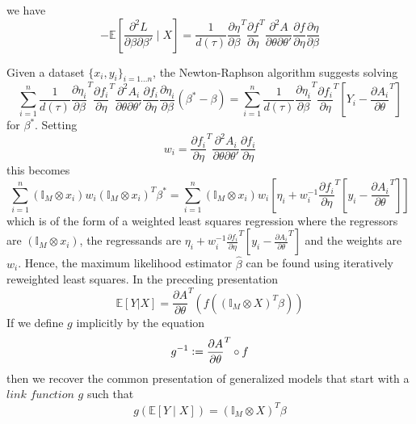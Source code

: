 \documentclass[11pt]{article}
\begin{document}
we have
\begin{equation}
- \mathbb{E} \left[ \frac{\partial^2 L}{\partial \beta \partial \beta'} \mid X \right] =
\frac{1}{d \left( \tau \right)}
\frac{\partial \eta}{\partial \beta}^T \frac{\partial f}{\partial \eta}^T \frac{\partial^2 A}{\partial \theta \partial \theta'} \frac{\partial f}{\partial \eta} \frac{\partial \eta}{\partial \beta}
\end{equation}

Given a dataset $\{ x_i, y_i \}_{i=1...n}$, the Newton-Raphson algorithm suggests solving
\begin{equation}
\sum_{i=1}^n \frac{1}{d \left( \tau \right)}
\frac{\partial \eta_i}{\partial \beta}^T \frac{\partial f_i}{\partial \eta}^T \frac{\partial^2 A_i}{\partial \theta \partial \theta'} \frac{\partial f_i}{\partial \eta} \frac{\partial \eta_i}{\partial \beta} \left( \beta^* - \beta \right) =
\sum_{i=1}^n \frac{1}{d \left( \tau \right)} \frac{\partial \eta_i}{\partial \beta}^T \frac{\partial f_i}{\partial \eta}^T \left[ Y_i - \frac{\partial A_i}{\partial \theta}^T \right] 
\end{equation}
for $\beta^*$.
Setting
\begin{equation}
w_i = \frac{\partial f_i}{\partial \eta}^T \frac{\partial^2 A_i}{\partial \theta \partial \theta'} \frac{\partial f_i}{\partial \eta}
\end{equation}
this becomes
\begin{equation}
\sum_{i=1}^n \left( \mathbb{I}_M \otimes x_i \right) w_i \left( \mathbb{I}_M \otimes x_i \right)^T \beta^* =
\sum_{i=1}^n \left( \mathbb{I}_M \otimes x_i \right) w_i
\left[ \eta_i + w_i^{-1} \frac{\partial f_i}{\partial \eta}^T \left[ y_i - \frac{\partial A_i}{\partial \theta}^T \right] \right]
\end{equation}
which is of the form of a weighted least squares regression where the regressors are $\left( \mathbb{I}_M \otimes x_i \right)$, the regressands are $\eta_i + w_i^{-1} \frac{\partial f_i}{\partial \eta}^T \left[ y_i - \frac{\partial A_i}{\partial \theta}^T \right]$ and the weights are $w_i$. Hence, the maximum likelihood estimator $\widehat{\beta}$ can be found using iteratively reweighted least squares.
In the preceding presentation
\begin{equation}
\mathbb{E} \left[ Y | X \right] = \frac{\partial A}{\partial \theta}^T \left( f \left( \left( \mathbb{I}_M \otimes X \right)^T \beta \right) \right)
\end{equation}
If we define $g$ implicitly by the equation
\begin{equation}
g^{-1} \vcentcolon = \frac{\partial A}{\partial \theta}^T \circ f
\end{equation}
then we recover the common presentation of generalized models that start with a $link$ $function$ $g$ such that
\begin{equation}
g \left( \mathbb{E} \left[ Y \mid X \right] \right) = \left( \mathbb{I}_M \otimes X \right)^T \beta
\end{equation}
\end{document}
